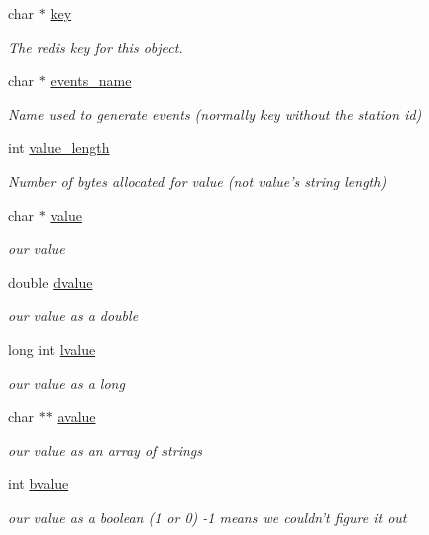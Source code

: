 \begin{DoxyCompactItemize}
char $\ast$ \hyperlink{structlsredis__obj__struct_aa8c5a453b9424e5666320b8675a42f5c}{key}
\begin{DoxyCompactList}\small\item\em The redis key for this object. \end{DoxyCompactList}\item 
char $\ast$ \hyperlink{structlsredis__obj__struct_ad0a987a011b580eab739cda831f78fbb}{events\-\_\-name}
\begin{DoxyCompactList}\small\item\em Name used to generate events (normally key without the station id) \end{DoxyCompactList}\item 
int \hyperlink{structlsredis__obj__struct_a664f0eaafb8dffc0dbde126e0340efb9}{value\-\_\-length}
\begin{DoxyCompactList}\small\item\em Number of bytes allocated for value (not value's string length) \end{DoxyCompactList}\item 
char $\ast$ \hyperlink{structlsredis__obj__struct_a0465c65288e8101805a6f91049164517}{value}
\begin{DoxyCompactList}\small\item\em our value \end{DoxyCompactList}\item 
double \hyperlink{structlsredis__obj__struct_ab60d0a71cabad6b921b6edb5a8f68996}{dvalue}
\begin{DoxyCompactList}\small\item\em our value as a double \end{DoxyCompactList}\item 
long int \hyperlink{structlsredis__obj__struct_a26211a0ab3fc02e7776e24dbc1f1256c}{lvalue}
\begin{DoxyCompactList}\small\item\em our value as a long \end{DoxyCompactList}\item 
char $\ast$$\ast$ \hyperlink{structlsredis__obj__struct_ac065eeede0e08f25bcfedd45022fe593}{avalue}
\begin{DoxyCompactList}\small\item\em our value as an array of strings \end{DoxyCompactList}\item 
int \hyperlink{structlsredis__obj__struct_ac3df3eaa275c1e8e333024c1fa8353af}{bvalue}
\begin{DoxyCompactList}\small\item\em our value as a boolean (1 or 0) -\/1 means we couldn't figure it out \end{DoxyCompactList}\item 
$$
\end{DoxyCompactItemize}
